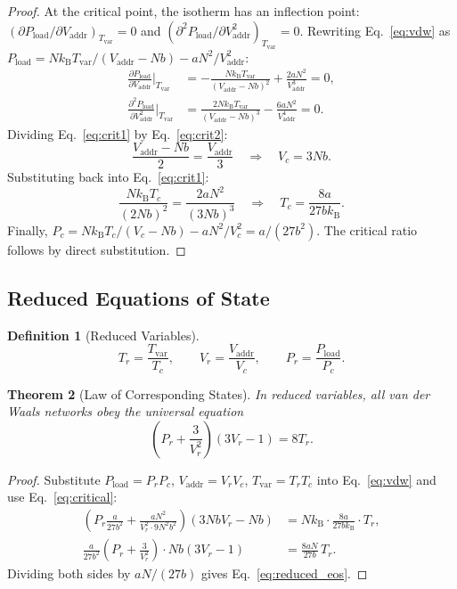 \documentclass[11pt,twocolumn,a4paper]{article}
\newtheorem{theorem}{Theorem}[section]
\theoremstyle{definition}
\newtheorem{definition}[theorem]{Definition}
\theoremstyle{remark}
\newcommand{\kB}{k_{\mathrm{B}}}
\newcommand{\Tvar}{T_{\mathrm{var}}}
\newcommand{\Pload}{P_{\mathrm{load}}}
\newcommand{\Vaddr}{V_{\mathrm{addr}}}
\newcommand{\pder}[2]{\frac{\partial #1}{\partial #2}}
\begin{document}
\begin{proof}
At the critical point, the isotherm has an inflection point:
$(\partial\Pload/\partial\Vaddr)_{\Tvar}=0$ and
$(\partial^2\Pload/\partial\Vaddr^2)_{\Tvar}=0$.
Rewriting Eq.~\eqref{eq:vdw} as $\Pload=N\kB\Tvar/(\Vaddr-Nb)-aN^2/\Vaddr^2$:
\begin{align}
  \pder{\Pload}{\Vaddr}\bigg|_{\Tvar}
  &= -\frac{N\kB\Tvar}{(\Vaddr-Nb)^2}+\frac{2aN^2}{\Vaddr^3}=0,
  \label{eq:crit1}\\
  \frac{\partial^2\Pload}{\partial\Vaddr^2}\bigg|_{\Tvar}
  &= \frac{2N\kB\Tvar}{(\Vaddr-Nb)^3}-\frac{6aN^2}{\Vaddr^4}=0.
  \label{eq:crit2}
\end{align}
Dividing Eq.~\eqref{eq:crit1} by Eq.~\eqref{eq:crit2}:
\[
  \frac{\Vaddr-Nb}{2} = \frac{\Vaddr}{3}
  \quad\Longrightarrow\quad V_c = 3Nb.
\]
Substituting back into Eq.~\eqref{eq:crit1}:
\[
  \frac{N\kB T_c}{(2Nb)^2} = \frac{2aN^2}{(3Nb)^3}
  \quad\Longrightarrow\quad T_c = \frac{8a}{27b\kB}.
\]
Finally, $P_c=N\kB T_c/(V_c-Nb)-aN^2/V_c^2 = a/(27b^2)$.
The critical ratio follows by direct substitution.
\end{proof}

\subsection{Reduced Equations of State}\label{sec:reduced}

\begin{definition}[Reduced Variables]\label{def:reduced}
\begin{equation}\label{eq:reduced_vars}
  T_r = \frac{\Tvar}{T_c},\qquad
  V_r = \frac{\Vaddr}{V_c},\qquad
  P_r = \frac{\Pload}{P_c}.
\end{equation}
\end{definition}

\begin{theorem}[Law of Corresponding States]\label{thm:corresponding}
In reduced variables, all van der Waals networks obey the universal equation
\begin{equation}\label{eq:reduced_eos}
  \left(P_r+\frac{3}{V_r^2}\right)(3V_r-1)=8T_r.
\end{equation}
\end{theorem}

\begin{proof}
Substitute $\Pload=P_r P_c$, $\Vaddr=V_r V_c$, $\Tvar=T_r T_c$ into
Eq.~\eqref{eq:vdw} and use Eq.~\eqref{eq:critical}:
\begin{align*}
  \left(P_r\frac{a}{27b^2}+\frac{aN^2}{V_r^2\cdot 9N^2b^2}\right)
  (3NbV_r-Nb)
  &= N\kB\cdot\frac{8a}{27b\kB}\cdot T_r,\\
  \frac{a}{27b^2}\left(P_r+\frac{3}{V_r^2}\right)\cdot Nb(3V_r-1)
  &= \frac{8aN}{27b}\,T_r.
\end{align*}
Dividing both sides by $aN/(27b)$ gives Eq.~\eqref{eq:reduced_eos}.
\end{proof}
\end{document}
